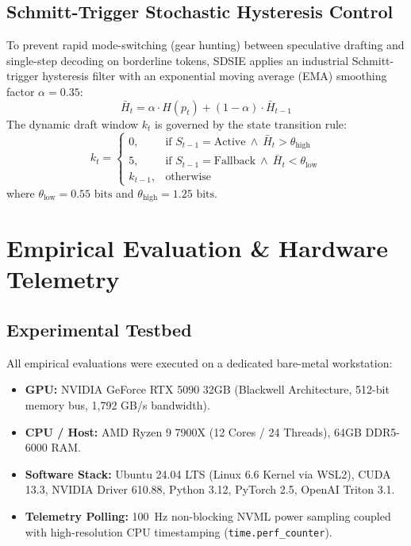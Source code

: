 \documentclass[10pt,journal,compsoc,twocolumn]{IEEEtran}
\begin{document}
\subsection{Schmitt-Trigger Stochastic Hysteresis Control}
To prevent rapid mode-switching (gear hunting) between speculative drafting and single-step decoding on borderline tokens, SDSIE applies an industrial Schmitt-trigger hysteresis filter with an exponential moving average (EMA) smoothing factor $\alpha = 0.35$:
\begin{equation}
\bar{H}_t = \alpha \cdot H(p_t) + (1 - \alpha) \cdot \bar{H}_{t-1}
\end{equation}
The dynamic draft window $k_t$ is governed by the state transition rule:
\begin{equation}
k_t = 
\begin{cases} 
0, & \text{if } S_{t-1} = \text{Active} \ \land \ \bar{H}_t > \theta_{\text{high}} \\
5, & \text{if } S_{t-1} = \text{Fallback} \ \land \ \bar{H}_t < \theta_{\text{low}} \\
k_{t-1}, & \text{otherwise}
\end{cases}
\end{equation}
where $\theta_{\text{low}} = 0.55\text{ bits}$ and $\theta_{\text{high}} = 1.25\text{ bits}$.

\section{Empirical Evaluation \& Hardware Telemetry}

\subsection{Experimental Testbed}
All empirical evaluations were executed on a dedicated bare-metal workstation:
\begin{itemize}
    \item \textbf{GPU:} NVIDIA GeForce RTX 5090 32GB (Blackwell Architecture, 512-bit memory bus, 1,792 GB/s bandwidth).
    \item \textbf{CPU / Host:} AMD Ryzen 9 7900X (12 Cores / 24 Threads), 64GB DDR5-6000 RAM.
    \item \textbf{Software Stack:} Ubuntu 24.04 LTS (Linux 6.6 Kernel via WSL2), CUDA 13.3, NVIDIA Driver 610.88, Python 3.12, PyTorch 2.5, OpenAI Triton 3.1.
    \item \textbf{Telemetry Polling:} 100~Hz non-blocking NVML power sampling coupled with high-resolution CPU timestamping (\texttt{time.perf\_counter}).
\end{itemize}
\end{document}
